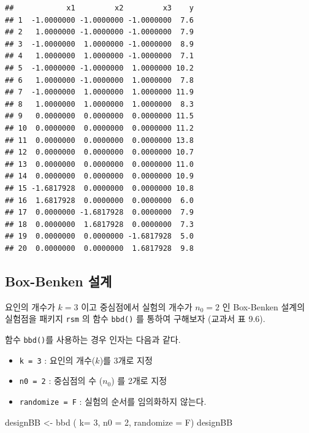 \documentclass[
]{book}
\newenvironment{Shaded}{\begin{snugshade}}{\end{snugshade}}
\newcommand{\AttributeTok}[1]{\textcolor[rgb]{0.77,0.63,0.00}{#1}}
\newcommand{\DecValTok}[1]{\textcolor[rgb]{0.00,0.00,0.81}{#1}}
\newcommand{\FunctionTok}[1]{\textcolor[rgb]{0.00,0.00,0.00}{#1}}
\newcommand{\NormalTok}[1]{#1}
\newcommand{\OtherTok}[1]{\textcolor[rgb]{0.56,0.35,0.01}{#1}}
\providecommand{\tightlist}{%
  \setlength{\itemsep}{0pt}\setlength{\parskip}{0pt}}
\theoremstyle{definition}
\theoremstyle{definition}
\theoremstyle{definition}
\theoremstyle{definition}
\theoremstyle{remark}
\begin{document}
\begin{verbatim}
##            x1         x2         x3    y
## 1  -1.0000000 -1.0000000 -1.0000000  7.6
## 2   1.0000000 -1.0000000 -1.0000000  7.9
## 3  -1.0000000  1.0000000 -1.0000000  8.9
## 4   1.0000000  1.0000000 -1.0000000  7.1
## 5  -1.0000000 -1.0000000  1.0000000 10.2
## 6   1.0000000 -1.0000000  1.0000000  7.8
## 7  -1.0000000  1.0000000  1.0000000 11.9
## 8   1.0000000  1.0000000  1.0000000  8.3
## 9   0.0000000  0.0000000  0.0000000 11.5
## 10  0.0000000  0.0000000  0.0000000 11.2
## 11  0.0000000  0.0000000  0.0000000 13.8
## 12  0.0000000  0.0000000  0.0000000 10.7
## 13  0.0000000  0.0000000  0.0000000 11.0
## 14  0.0000000  0.0000000  0.0000000 10.9
## 15 -1.6817928  0.0000000  0.0000000 10.8
## 16  1.6817928  0.0000000  0.0000000  6.0
## 17  0.0000000 -1.6817928  0.0000000  7.9
## 18  0.0000000  1.6817928  0.0000000  7.3
## 19  0.0000000  0.0000000 -1.6817928  5.0
## 20  0.0000000  0.0000000  1.6817928  9.8
\end{verbatim}

\hypertarget{box-benken-uxc124uxacc4-1}{%
\subsection{Box-Benken 설계}\label{box-benken-uxc124uxacc4-1}}

요인의 개수가 \(k=3\) 이고 중심점에서 실험의 개수가 \(n_0=2\) 인 Box-Benken 설계의 실험점을
패키지 \texttt{rsm} 의 함수 \texttt{bbd()} 를 통하여 구해보자 (교과서 표 9.6).

함수 \texttt{bbd()}를 사용하는 경우 인자는 다음과 같다.

\begin{itemize}
\tightlist
\item
  \texttt{k\ =\ 3} : 요인의 개수(\(k\))를 3개로 지정
\item
  \texttt{n0\ =\ 2} : 중심점의 수 (\(n_0\)) 를 2개로 지정
\item
  \texttt{randomize\ =\ F} : 실험의 순서를 임의화하지 않는다.
\end{itemize}

\begin{Shaded}
\begin{Highlighting}[]
\NormalTok{designBB }\OtherTok{\textless{}{-}} \FunctionTok{bbd}\NormalTok{ ( }\AttributeTok{k=} \DecValTok{3}\NormalTok{, }\AttributeTok{n0 =} \DecValTok{2}\NormalTok{,  }\AttributeTok{randomize =}\NormalTok{ F)}
\NormalTok{designBB}
\end{Highlighting}
\end{Shaded}
\end{document}
